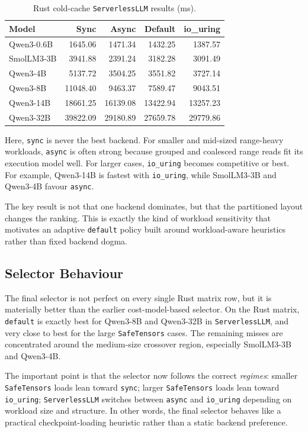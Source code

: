 \begin{table}[h]
\caption{Rust cold-cache \texttt{ServerlessLLM} results (ms).}
\label{tab:rust-serverlessllm}
\centering
\begin{tabular}{lrrrr}
\toprule
Model & Sync & Async & Default & io\_uring \\
\midrule
Qwen3-0.6B & 1645.06 & 1471.34 & 1432.25 & 1387.57 \\
SmolLM3-3B & 3941.88 & 2391.24 & 3182.28 & 3091.49 \\
Qwen3-4B & 5137.72 & 3504.25 & 3551.82 & 3727.14 \\
Qwen3-8B & 11048.40 & 9463.37 & 7589.47 & 9043.51 \\
Qwen3-14B & 18661.25 & 16139.08 & 13422.94 & 13257.23 \\
Qwen3-32B & 39822.09 & 29180.89 & 27659.78 & 29779.86 \\
\bottomrule
\end{tabular}
\end{table}

Here, \texttt{sync} is never the best backend. For smaller and mid-sized range-heavy workloads, \texttt{async} is often strong because grouped and coalesced range reads fit its execution model well. For larger cases, \texttt{io\_uring} becomes competitive or best. For example, Qwen3-14B is fastest with \texttt{io\_uring}, while SmolLM3-3B and Qwen3-4B favour \texttt{async}.

The key result is not that one backend dominates, but that the partitioned layout changes the ranking. This is exactly the kind of workload sensitivity that motivates an adaptive \texttt{default} policy built around workload-aware heuristics rather than fixed backend dogma.

\subsection{Selector Behaviour}

The final selector is not perfect on every single Rust matrix row, but it is materially better than the earlier cost-model-based selector. On the Rust matrix, \texttt{default} is exactly best for Qwen3-8B and Qwen3-32B in \texttt{ServerlessLLM}, and very close to best for the large \texttt{SafeTensors} cases. The remaining misses are concentrated around the medium-size crossover region, especially SmolLM3-3B and Qwen3-4B.

The important point is that the selector now follows the correct \emph{regimes}: smaller \texttt{SafeTensors} loads lean toward \texttt{sync}; larger \texttt{SafeTensors} loads lean toward \texttt{io\_uring}; \texttt{ServerlessLLM} switches between \texttt{async} and \texttt{io\_uring} depending on workload size and structure. In other words, the final selector behaves like a practical checkpoint-loading heuristic rather than a static backend preference.

